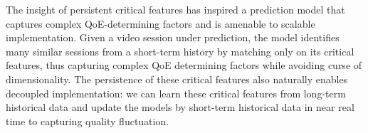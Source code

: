 The insight of persistent critical features has inspired
a prediction model that captures complex QoE-determining 
factors and is amenable to scalable implementation.
Given a video session under prediction, the model 
identifies many similar sessions from a short-term 
history by matching only on its critical features,
thus capturing complex QoE determining factors
while avoiding curse of dimensionality.
The persistence of these critical features also naturally
enables decoupled implementation: 
we can learn these critical features from long-term historical 
data and update the models by short-term historical data 
in near real time to capturing quality fluctuation.


